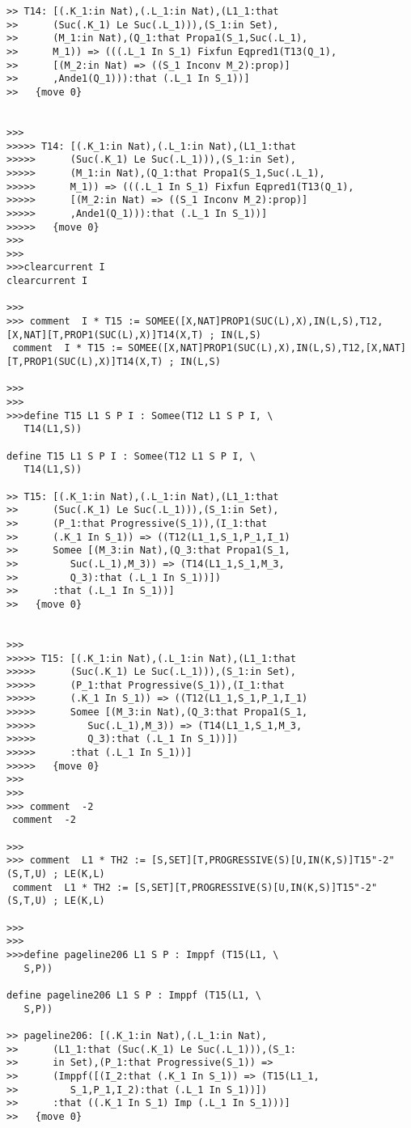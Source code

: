 \documentclass{article}
\begin{document}
\begin{verbatim}
>> T14: [(.K_1:in Nat),(.L_1:in Nat),(L1_1:that
>>      (Suc(.K_1) Le Suc(.L_1))),(S_1:in Set),
>>      (M_1:in Nat),(Q_1:that Propa1(S_1,Suc(.L_1),
>>      M_1)) => (((.L_1 In S_1) Fixfun Eqpred1(T13(Q_1),
>>      [(M_2:in Nat) => ((S_1 Inconv M_2):prop)]
>>      ,Ande1(Q_1))):that (.L_1 In S_1))]
>>   {move 0}


>>>
>>>>> T14: [(.K_1:in Nat),(.L_1:in Nat),(L1_1:that
>>>>>      (Suc(.K_1) Le Suc(.L_1))),(S_1:in Set),
>>>>>      (M_1:in Nat),(Q_1:that Propa1(S_1,Suc(.L_1),
>>>>>      M_1)) => (((.L_1 In S_1) Fixfun Eqpred1(T13(Q_1),
>>>>>      [(M_2:in Nat) => ((S_1 Inconv M_2):prop)]
>>>>>      ,Ande1(Q_1))):that (.L_1 In S_1))]
>>>>>   {move 0}
>>>
>>>
>>>clearcurrent I
clearcurrent I

>>>
>>> comment  I * T15 := SOMEE([X,NAT]PROP1(SUC(L),X),IN(L,S),T12,[X,NAT][T,PROP1(SUC(L),X)]T14(X,T) ; IN(L,S)
 comment  I * T15 := SOMEE([X,NAT]PROP1(SUC(L),X),IN(L,S),T12,[X,NAT][T,PROP1(SUC(L),X)]T14(X,T) ; IN(L,S)

>>>
>>>
>>>define T15 L1 S P I : Somee(T12 L1 S P I, \
   T14(L1,S))

define T15 L1 S P I : Somee(T12 L1 S P I, \
   T14(L1,S))

>> T15: [(.K_1:in Nat),(.L_1:in Nat),(L1_1:that
>>      (Suc(.K_1) Le Suc(.L_1))),(S_1:in Set),
>>      (P_1:that Progressive(S_1)),(I_1:that
>>      (.K_1 In S_1)) => ((T12(L1_1,S_1,P_1,I_1)
>>      Somee [(M_3:in Nat),(Q_3:that Propa1(S_1,
>>         Suc(.L_1),M_3)) => (T14(L1_1,S_1,M_3,
>>         Q_3):that (.L_1 In S_1))])
>>      :that (.L_1 In S_1))]
>>   {move 0}


>>>
>>>>> T15: [(.K_1:in Nat),(.L_1:in Nat),(L1_1:that
>>>>>      (Suc(.K_1) Le Suc(.L_1))),(S_1:in Set),
>>>>>      (P_1:that Progressive(S_1)),(I_1:that
>>>>>      (.K_1 In S_1)) => ((T12(L1_1,S_1,P_1,I_1)
>>>>>      Somee [(M_3:in Nat),(Q_3:that Propa1(S_1,
>>>>>         Suc(.L_1),M_3)) => (T14(L1_1,S_1,M_3,
>>>>>         Q_3):that (.L_1 In S_1))])
>>>>>      :that (.L_1 In S_1))]
>>>>>   {move 0}
>>>
>>>
>>> comment  -2
 comment  -2

>>>
>>> comment  L1 * TH2 := [S,SET][T,PROGRESSIVE(S)[U,IN(K,S)]T15"-2"(S,T,U) ; LE(K,L)
 comment  L1 * TH2 := [S,SET][T,PROGRESSIVE(S)[U,IN(K,S)]T15"-2"(S,T,U) ; LE(K,L)

>>>
>>>
>>>define pageline206 L1 S P : Imppf (T15(L1, \
   S,P))

define pageline206 L1 S P : Imppf (T15(L1, \
   S,P))

>> pageline206: [(.K_1:in Nat),(.L_1:in Nat),
>>      (L1_1:that (Suc(.K_1) Le Suc(.L_1))),(S_1:
>>      in Set),(P_1:that Progressive(S_1)) =>
>>      (Imppf([(I_2:that (.K_1 In S_1)) => (T15(L1_1,
>>         S_1,P_1,I_2):that (.L_1 In S_1))])
>>      :that ((.K_1 In S_1) Imp (.L_1 In S_1)))]
>>   {move 0}



\end{verbatim}
\end{document}
